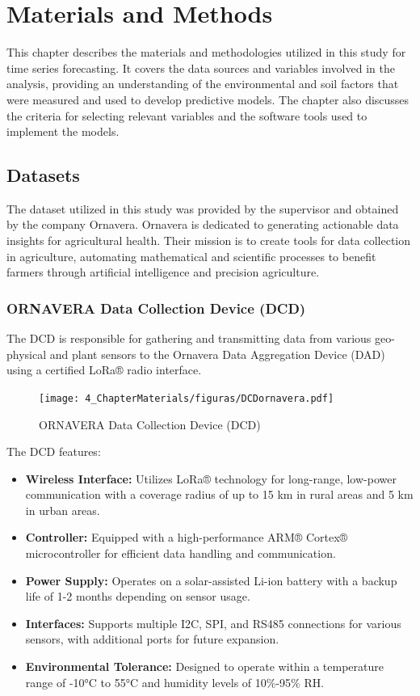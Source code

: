 \chapter{Materials and Methods}
\pagestyle{esitscCD}

This chapter describes the materials and methodologies utilized in this study for time series forecasting. It covers the data sources and variables involved in the analysis, providing an understanding of the environmental and soil factors that were measured and used to develop predictive models. The chapter also discusses the criteria for selecting relevant variables and the software tools used to implement the models.

\section{Datasets}

The dataset utilized in this study was provided by the supervisor and obtained by the company Ornavera. Ornavera is dedicated to generating actionable data insights for agricultural health. Their mission is to create tools for data collection in agriculture, automating mathematical and scientific processes to benefit farmers through artificial intelligence and precision agriculture.

\subsection{ORNAVERA Data Collection Device (DCD)}

The DCD is responsible for gathering and transmitting data from various geo-physical and plant sensors to the Ornavera Data Aggregation Device (DAD) using a certified LoRa® radio interface.
\begin{figure}[htbp]
    \centering
    \texttt{[image: 4\_ChapterMaterials/figuras/DCDornavera.pdf]}
    \caption{ORNAVERA Data Collection Device (DCD)\cite{ornavera2020dcd}}
    \end{figure}

The DCD features:
\begin{itemize}
    \item \textbf{Wireless Interface:} Utilizes LoRa® technology for long-range, low-power communication with a coverage radius of up to 15 km in rural areas and 5 km in urban areas.
    \item \textbf{Controller:} Equipped with a high-performance ARM® Cortex® microcontroller for efficient data handling and communication.
    \item \textbf{Power Supply:} Operates on a solar-assisted Li-ion battery with a backup life of 1-2 months depending on sensor usage.
    \item \textbf{Interfaces:} Supports multiple I2C, SPI, and RS485 connections for various sensors, with additional ports for future expansion.
    \item \textbf{Environmental Tolerance:} Designed to operate within a temperature range of -10°C to 55°C and humidity levels of 10\%-95\% RH.
\end{itemize}


